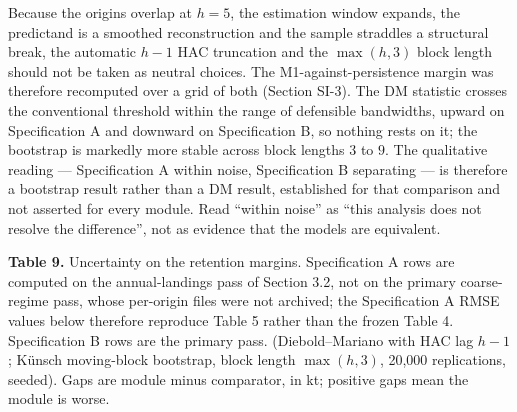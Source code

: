 \documentclass[11pt]{article}
\begin{document}
Because the origins overlap at \(h=5\), the estimation window expands,
the predictand is a smoothed reconstruction and the sample straddles a
structural break, the automatic \(h-1\) HAC truncation and the
\(\max(h,3)\) block length should not be taken as neutral choices. The
M1-against-persistence margin was therefore recomputed over a grid of
both (Section SI-3). The DM statistic crosses the conventional
threshold within the range of defensible bandwidths, upward on
Specification A and downward on Specification B, so nothing rests on it;
the bootstrap is markedly more stable across block lengths \(3\) to
\(9\). The qualitative reading --- Specification A within noise,
Specification B separating --- is therefore a bootstrap result rather
than a DM result, established for that comparison and not asserted for
every module. Read
``within noise'' as ``this analysis does not resolve the difference'',
not as evidence that the models are equivalent.

\textbf{Table 9.} Uncertainty on the retention margins. Specification A
rows are computed on the annual-landings pass of Section 3.2, not on the
primary coarse-regime pass, whose per-origin files were not archived;
the Specification A RMSE values below therefore reproduce Table 5 rather
than the frozen Table 4. Specification B rows are the primary pass.
(Diebold--Mariano with HAC lag \(h-1\); K\"unsch moving-block
bootstrap, block length \(\max(h,3)\), 20,000 replications, seeded).
Gaps are module minus comparator, in kt; positive gaps mean the module
is worse.
\end{document}
